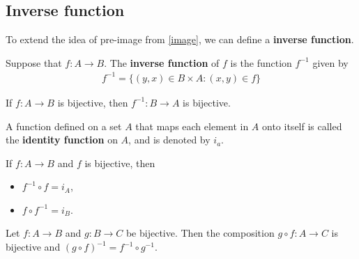 \newpage
\subsection{Inverse function}

To extend the idea of pre-image from \ref{image}, we can define a \textbf{inverse function}.

\begin{definition}
	Suppose that $f:A\rightarrow B$. The \textbf{inverse function} of $f$ is the function $f^{-1}$ given by
	\begin{align*}
		f^{-1} = \{(y,x)\in B\times A: (x,y)\in f\}
 	\end{align*} 
\end{definition}

\begin{remark}
	If $f:A\rightarrow B$ is bijective, then $f^{-1}:B\rightarrow A$ is bijective. 
\end{remark}

\begin{definition}
	A function defined on a set $A$ that maps each element in $A$ onto itself is called the \textbf{identity function} on $A$, and is denoted by $i_a$.
\end{definition}

\begin{remark}
	If $f:A\rightarrow B$ and $f$ is bijective, then
	\begin{itemize}
		\item $f^{-1}\circ f = i_A$,
		\item $f\circ f^{-1} = i_B$.
	\end{itemize}
\end{remark}

\begin{theorem}
	Let $f:A\rightarrow B$ and $g:B\rightarrow C$ be bijective. Then the composition $g\circ f:A\rightarrow C$ is bijective and $(g\circ f)^{-1}=f^{-1}\circ g^{-1}$.
\end{theorem}

